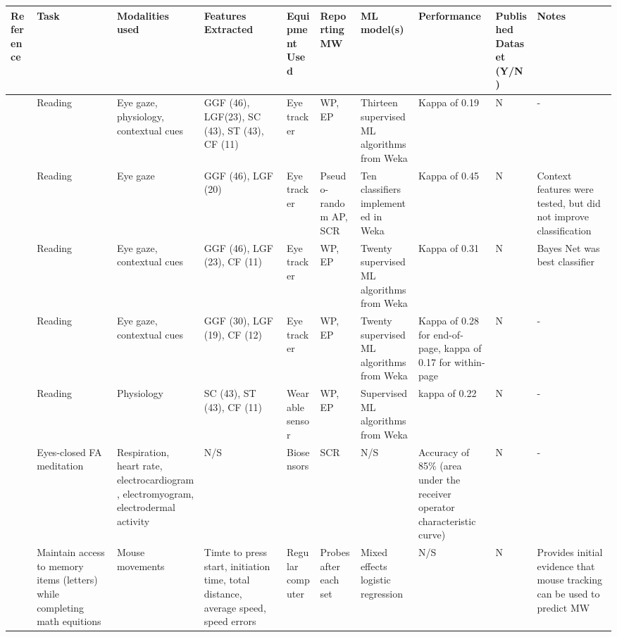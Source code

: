 \begin{landscape} %

\begin{xtabular}{p{25mm}p{28mm}p{30mm}p{22mm}p{38mm}p{22mm}p{23mm}p{22mm}p{15mm}p{3cm}}
  \toprule
  Reference & Task & Modalities used & Features Extracted \footnotemark[1] & Equipment Used & Reporting MW \footnotemark[2] & ML model(s) & Performance & Published Dataset (Y/N) & Notes \\
  \midrule
  \midrule
\cite{Bixler2015AutomaticPhysiology} & Reading & Eye gaze, physiology, contextual cues & GGF (46), LGF(23), SC (43), ST (43), CF (11) & Eye tracker & WP, EP & Thirteen supervised ML algorithms from Weka & Kappa of 0.19 & N & -\\ \midrule 
\cite{Bixler2015AutomaticAwareness} & Reading & Eye gaze & GGF (46), LGF (20) & Eye tracker & Pseudo-random AP, SCR & Ten classifiers implemented in Weka & Kappa of 0.45 & N & Context features were tested, but did not improve classification\\ \midrule 
\cite{Bixler2016AutomaticReading} & Reading & Eye gaze, contextual cues & GGF (46), LGF (23), CF (11) & Eye tracker & WP, EP & Twenty supervised ML algorithms from Weka & Kappa of 0.31 & N & Bayes Net was best classifier\\ \midrule
\cite{Bixler2014TowardWandering} & Reading & Eye gaze, contextual cues & GGF (30), LGF (19), CF (12) & Eye tracker & WP, EP & Twenty supervised ML algorithms from Weka & Kappa of 0.28 for end-of-page, kappa of 0.17 for within-page & N & -\\ \midrule 
\cite{Blanchard2014AutomatedLearning} & Reading & Physiology & SC (43), ST (43), CF (11) & Wearable sensor & WP, EP & Supervised ML algorithms from Weka & kappa of 0.22 & N & -\\ \midrule
\cite{Cheetham2016AutomatedApplication} & Eyes-closed FA meditation & Respiration, heart rate, electrocardiogram, electromyogram, electrodermal activity & N/S & Biosensors & SCR & N/S & Accuracy of 85\% (area under the receiver operator characteristic curve) & N & -\\\hline 
\cite{DaSilva2018WanderingWandering} & Maintain access to memory items (letters) while completing math equitions & Mouse movements & Timte to press start, initiation time, total distance, average speed, speed errors & Regular computer & Probes after each set & Mixed effects logistic regression & N/S & N & Provides initial evidence that mouse tracking can be used to predict MW\\\hline 

\end{xtabular}
\end{landscape}
